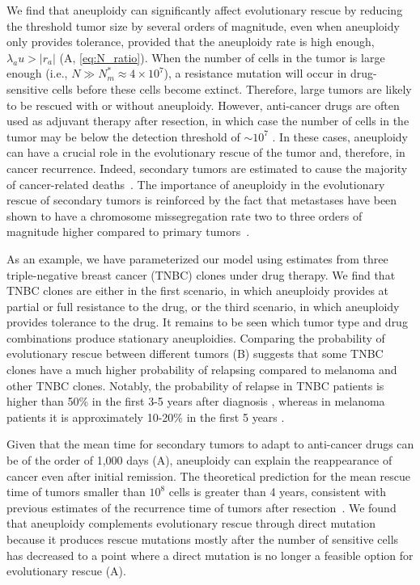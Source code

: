 \documentclass[12pt]{extarticle}
\renewcommand{\Delta}{r}
\begin{document}
We find that aneuploidy can significantly affect evolutionary rescue by reducing the threshold tumor size by several orders of magnitude, even when aneuploidy only provides tolerance, provided that the aneuploidy rate is high enough, $\lambda_a u > |\Delta_a|$ (A, \cref{eq:N_ratio}).
When the number of cells in the tumor is large enough (i.e., $N \gg N_m^* \approx 4\times10^7$), a resistance mutation will occur in drug-sensitive cells before these cells become extinct. Therefore, large tumors are likely to be rescued with or without aneuploidy.
However, anti-cancer drugs are often used as adjuvant therapy after resection, in which case the number of cells in the tumor may be below the detection threshold of $\sim10^7$  \citep{bozic2013evolutionary}. In these cases, aneuploidy can have a crucial role in the evolutionary rescue of the tumor and, therefore, in cancer recurrence. Indeed, secondary tumors are estimated to cause the majority of cancer-related deaths~\citep{chaffer2011perspective}. The importance of aneuploidy in the evolutionary rescue of secondary tumors is reinforced by the fact that metastases have been shown to have a chromosome missegregation rate two to three orders of magnitude higher compared to primary tumors~\citep{kimmel2023intra}.

As an example, we have parameterized our model using estimates from three triple-negative breast cancer (TNBC) clones under drug therapy.
We find that TNBC clones are either in the first scenario, in which aneuploidy provides at partial or full resistance to the drug, or the third scenario, in which aneuploidy provides tolerance to the drug. 
It remains to be seen which tumor type and drug combinations produce stationary aneuploidies. %
Comparing the probability of evolutionary rescue between different tumors (B) suggests that some TNBC clones have a much higher probability of relapsing compared to melanoma and other TNBC clones. Notably, the probability of relapse in TNBC patients is higher than 50\% in the first 3-5 years after diagnosis \citep{taushanova2023synchronous}, whereas in melanoma patients it is approximately 10-20\% in the first 5 years \citep{wan2022prediction,von_schuckmann2019risk}. %

Given that the mean time for secondary tumors to adapt to anti-cancer drugs can be of the order of 1,000 days (A), aneuploidy can explain the reappearance of cancer even after initial remission. The theoretical prediction for the mean rescue time of tumors smaller than $10^8$ cells is greater than 4 years, consistent with previous estimates of the recurrence time of tumors after resection~\citep{avanzini2019cancer}. We found that aneuploidy complements evolutionary rescue through direct mutation because it produces rescue mutations mostly after the number of sensitive cells has decreased to a point where a direct mutation is no longer a feasible option for evolutionary rescue (A).
\end{document}
